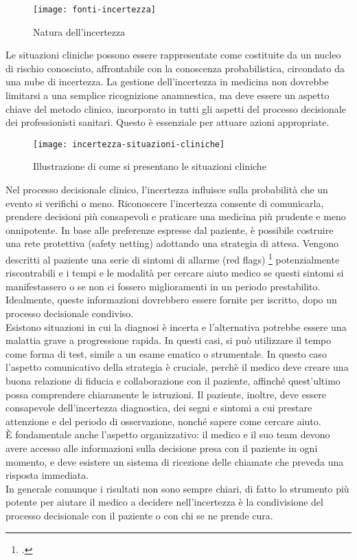 \begin{figure}[!ht] 
    \centering 
    \texttt{[image: fonti-incertezza]} 
    \caption{Natura dell'incertezza}
\end{figure}

Le situazioni cliniche possono essere rappresentate come costituite da un nucleo di rischio conosciuto, affrontabile con la conoscenza probabilistica, circondato da una nube di incertezza. La gestione dell'incertezza in medicina non dovrebbe limitarsi a una semplice ricognizione anamnestica, ma deve essere un aspetto chiave del metodo clinico, incorporato in tutti gli aspetti del processo decisionale dei professionisti sanitari. Questo è essenziale per attuare azioni appropriate.\\
\begin{figure}[!ht] 
    \centering 
    \texttt{[image: incertezza-situazioni-cliniche]} 
    \caption{Illustrazione di come si presentano le situazioni cliniche}
\end{figure}


Nel processo decisionale clinico, l'incertezza influisce sulla probabilità che un evento si verifichi o meno. Riconoscere l'incertezza consente di comunicarla, prendere decisioni più consapevoli e praticare una medicina più prudente e meno onnipotente.
In base alle preferenze espresse dal paziente, è possibile costruire una rete protettiva (safety netting) adottando una strategia di attesa. Vengono descritti al paziente una serie di sintomi di allarme (red flags) \footcite{womak:recenti-progressi-medicina} potenzialmente riscontrabili e i tempi e le modalità per cercare aiuto medico se questi sintomi si manifestassero o se non ci fossero miglioramenti in un periodo prestabilito. Idealmente, queste informazioni dovrebbero essere fornite per iscritto, dopo un processo decisionale condiviso.\\

Esistono situazioni in cui la diagnosi è incerta e l'alternativa potrebbe essere una malattia grave a progressione rapida. In questi casi, si può utilizzare il tempo come forma di test, simile a un esame ematico o strumentale. In questo caso l'aspetto comunicativo della strategia è cruciale, perchè il medico deve creare una buona relazione di fiducia e collaborazione con il paziente, affinché quest'ultimo possa comprendere chiaramente le istruzioni. Il paziente, inoltre, deve essere consapevole dell'incertezza diagnostica, dei segni e sintomi a cui prestare attenzione e del periodo di osservazione, nonché sapere come cercare aiuto.\\
È fondamentale anche l'aspetto organizzativo: il medico e il suo team devono avere accesso alle informazioni sulla decisione presa con il paziente in ogni momento, e deve esistere un sistema di ricezione delle chiamate che preveda una risposta immediata.\\
In generale comunque i risultati non sono sempre chiari, di fatto lo strumento più potente per aiutare il medico a decidere nell'incertezza è la condivisione del processo decisionale con il paziente o con chi se ne prende cura.\\

